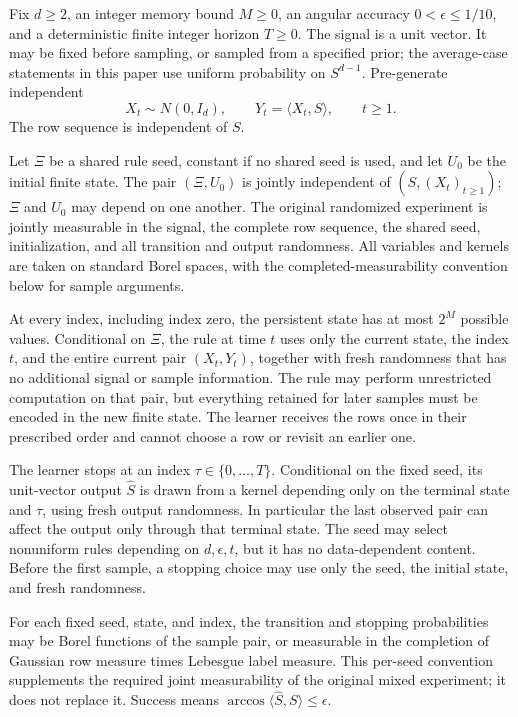 \begin{definition}
\label{def:r-streaming-model}
Fix \(d\ge2\), an integer memory bound \(M\ge0\), an angular
accuracy \(0<\epsilon\le1/10\), and a deterministic finite integer
horizon \(T\ge0\).  The signal is a unit vector.  It may be fixed
before sampling, or sampled from a specified prior; the
average-case statements in this paper use uniform probability on
\(S^{d-1}\).  Pre-generate independent
\[
 X_t\sim N(0,I_d),\qquad Y_t=\langle X_t,S\rangle,\qquad t\ge1.
\]
The row sequence is independent of \(S\).

Let \(\Xi\) be a shared rule seed, constant if no shared seed is
used, and let \(U_0\) be the initial finite state.  The pair
\((\Xi,U_0)\) is jointly independent of
\((S,(X_t)_{t\ge1})\); \(\Xi\) and \(U_0\) may depend on one
another.  The original randomized experiment is jointly measurable
in the signal, the complete row sequence, the shared seed,
initialization, and all transition and output randomness.  All
variables and kernels are taken on standard Borel spaces, with the
completed-measurability convention below for sample arguments.

At every index, including index zero, the persistent state has at most \(2^M\)
possible values.  Conditional on \(\Xi\), the rule at time \(t\)
uses only the current state, the index \(t\), and the entire current
pair \((X_t,Y_t)\), together with fresh randomness that has no
additional signal or sample information.  The rule may perform
unrestricted computation on that pair, but everything retained for
later samples must be encoded in the new finite state.  The learner
receives the rows once in their prescribed order and cannot choose a
row or revisit an earlier one.

The learner stops at an index \(\tau\in\{0,\ldots,T\}\).  Conditional
on the fixed seed, its unit-vector output \(\widehat S\) is drawn
from a kernel depending only on the terminal state and \(\tau\),
using fresh output randomness.  In particular the last observed pair
can affect the output only through that terminal state.  The seed
may select nonuniform rules depending on \(d,\epsilon,t\), but it
has no data-dependent content.
Before the first sample, a stopping choice may use only the seed,
the initial state, and fresh randomness.

For each fixed seed, state, and index, the transition and stopping
probabilities may be Borel functions of the sample pair, or
measurable in the completion of Gaussian row measure times Lebesgue
label measure.  This per-seed convention supplements the required
joint measurability of the original mixed experiment; it does not
replace it.  Success means
\(\arccos\langle\widehat S,S\rangle\le\epsilon\).
\end{definition}

